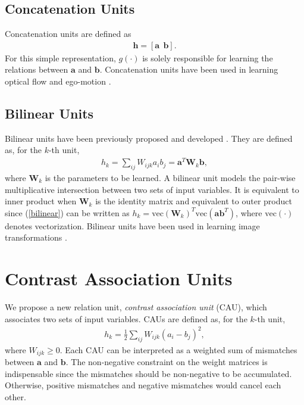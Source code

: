 \documentclass[conference]{IEEEtran}
\begin{document}
\subsection{Concatenation Units}
Concatenation units are defined as 
\begin{align}
\mathbf{h} =  [\mathbf{a}\ \ \mathbf{b}].
\end{align}
For this simple representation, $g(\cdot)$ is solely responsible for learning the relations between $\mathbf{a}$ and $\mathbf{b}$.
Concatenation units have been used in learning optical flow \cite{fischer2015flownet} and ego-motion \cite{agrawal2015learning}.

\subsection{Bilinear Units}
Bilinear units have been previously proposed and developed  \cite{hinton1981parallel,olshausen1993neurobiological,tenenbaum2000separating}.
They are defined as, for the $k$-th unit, 
\begin{align}
h_k = \sum_{ij}W_{ijk}a_ib_j = \mathbf{a}^T \mathbf{W}_k \mathbf{b},
\label{bilinear}
\end{align}
where $\mathbf{W}_k$ is the parameters to be learned.
A bilinear unit models the pair-wise multiplicative intersection between two sets of input variables. It is equivalent to inner product when $\mathbf{W}_k$ is the identity matrix and equivalent to outer product since (\ref{bilinear}) can be written as $h_k = \text{vec}(\mathbf{W}_k)^T\text{vec}(\mathbf{ab}^T)$, where $\text{vec}(\cdot)$ denotes vectorization. Bilinear units have been used in learning image transformations \cite{memisevic2010learning,rocco2017convolutional}.






\section{Contrast Association Units} \label{sec:cau}

We propose a new relation unit, \textit{contrast association unit} (CAU), which associates two sets of input variables. CAUs are defined as, for the $k$-th unit,
\begin{align}
h_k = \frac{1}{2}\sum_{ij}W_{ijk}(a_i-b_j)^2,
\label{cau}
\end{align}
where $W_{ijk} \geq 0$. 
Each CAU can be interpreted as a weighted sum of mismatches between $\mathbf{a}$ and $\mathbf{b}$. The non-negative constraint on the weight matrices is indispensable since the mismatches should be non-negative to be accumulated. Otherwise, positive mismatches and negative mismatches would cancel each other.
\end{document}

